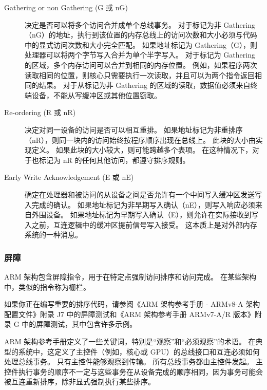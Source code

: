 \begin{description}
  \item [Gathering or non Gathering (G 或 nG)]

  决定是否可以将多个访问合并成单个总线事务。
  对于标记为非 Gathering（nG）的地址，执行到该位置的内存总线上的访问次数和大小必须与代码中的显式访问次数和大小完全匹配。
  如果地址标记为 Gathering（G），则处理器可以将两个字节写入合并为单个半字写入。
  对于标记为 Gathering 的区域，多个内存访问可以合并到相同的内存位置。
  例如，如果程序两次读取相同的位置，则核心只需要执行一次读取，并且可以为两个指令返回相同的结果。
  对于从标记为非 Gathering 的区域的读取，数据值必须来自终端设备，不能从写缓冲区或其他位置窃取。

  \item [Re-ordering (R 或 nR)]

  决定对同一设备的访问是否可以相互重排。
  如果地址标记为非重排序（nR），则同一块内的访问始终按程序顺序出现在总线上。
  此块的大小由实现定义。
  如果此块的大小较大，则可能跨越多个表项。
  在这种情况下，对于也标记为
  nR 的任何其他访问，都遵守排序规则。

  \item [Early Write Acknowledgement (E 或 nE)]

  确定在处理器和被访问的从设备之间是否允许有一个中间写入缓冲区发送写入完成的确认。
  如果地址标记为非早期写入确认（nE），则写入响应必须来自外围设备。
  如果地址标记为早期写入确认（E），则允许在实际接收到写入之前，互连逻辑中的缓冲区提前信号写入接受。
  这本质上是对外部内存系统的一种消息。

\end{description}

\subsubsection{屏障}

ARM 架构包含屏障指令，用于在特定点强制访问排序和访问完成。
在某些架构中，类似的指令称为栅栏。

如果你正在编写重要的排序代码，请参阅《ARM 架构参考手册 -
ARMv8-A 架构配置文件》附录 J7 中的屏障测试和《ARM 架构参考手册
ARMv7-A/R 版本》附录 G 中的屏障测试，其中包含许多示例。

ARM 架构参考手册定义了一些关键词，特别是“观察”和“必须观察”的术语。
在典型的系统中，这定义了主控件（例如，核心或 GPU）的总线接口和互连必须如何处理总线事务。
只有主控件能够观察到传输。
所有总线事务都由主控件发起。
主控件执行事务的顺序不一定与这些事务在从设备完成的顺序相同，因为事务可能会被互连重新排序，除非显式强制执行某些排序。

